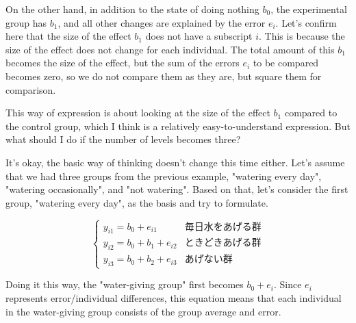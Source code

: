 \documentclass{ltjbook}
\begin{document}
On the other hand, in addition to the state of doing nothing $b_0$, the experimental group has $b_1$, and all other changes are explained by the error $e_i$. Let's confirm here that the size of the effect $b_1$ does not have a subscript $i$. This is because the size of the effect does not change for each individual. The total amount of this $b_1$ becomes the size of the effect, but the sum of the errors $e_i$ to be compared becomes zero, so we do not compare them as they are, but square them for comparison.

This way of expression is about looking at the size of the effect $b_1$ compared to the control group, which I think is a relatively easy-to-understand expression. But what should I do if the number of levels becomes three?

It's okay, the basic way of thinking doesn't change this time either. Let's assume that we had three groups from the previous example, "watering every day", "watering occasionally", and "not watering". Based on that, let's consider the first group, "watering every day", as the basis and try to formulate.

\[
	\begin{cases}
		y_{i1} = b_0 + e_{i1}       & \mbox{毎日水をあげる群} \\
		y_{i2} = b_0 + b_1 + e_{i2} & \mbox{ときどきあげる群} \\
		y_{i3} = b_0 + b_2 + e_{i3} & \mbox{あげない群}
	\end{cases}
\]

Doing it this way, the "water-giving group" first becomes $b_0+e_i$. Since $e_i$ represents error/individual differences, this equation means that each individual in the water-giving group consists of the group average and error.
\end{document}

